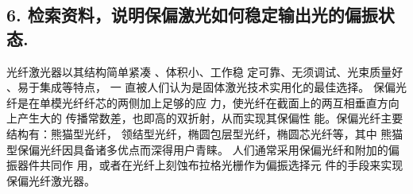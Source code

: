 \documentclass[10pt,a4paper,twoside,UTF8]{ctexart}
\begin{document}
\subsection*{6. 检索资料，说明保偏激光如何稳定输出光的偏振状态.}
光纤激光器以其结构简单紧凑 、体积小、工作稳
定可靠、无须调试、光束质量好 、易于集成等特点， 一
直被人们认为是固体激光技术实用化的最佳选择。
保偏光纤是在单模光纤纤芯的两侧加上足够的应
力，使光纤在截面上的两互相垂直方向上产生大的
传播常数差，也即高的双折射，从而实现其保偏性
能。保偏光纤主要结构有：熊猫型光纤，
领结型光纤，椭圆包层型光纤，椭圆芯光纤等，其中
熊猫型保偏光纤因具备诸多优点而深得用户青睐。
人们通常采用保偏光纤和附加的偏振器件共同作
用，或者在光纤上刻蚀布拉格光栅作为偏振选择元
件的手段来实现保偏光纤激光器。
\end{document}
